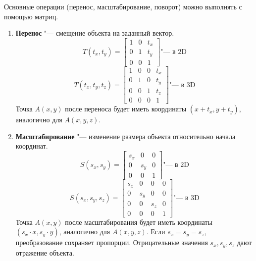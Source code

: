 Основные операции (перенос, масштабирование, поворот) можно выполнять с помощью матриц.
\begin{enumerate}
    \item \textbf{Перенос} "--- смещение объекта на заданный вектор.
    \begin{equation}
        T(t_{x}, t_{y}) = 
        \begin{bmatrix}
            1 & 0 & t_{x} \\
            0 & 1 & t_{y} \\
            0 & 0 & 1
        \end{bmatrix}
        \text{"--- в 2D}
    \end{equation}
    \begin{equation}
        T(t_{x}, t_{y}, t_{z}) = 
        \begin{bmatrix}
            1 & 0 & 0 & t_{x} \\
            0 & 1 & 0 & t_{y} \\
            0 & 0 & 1 & t_{z} \\
            0 & 0 & 0 & 1
        \end{bmatrix}
        \text{"--- в 3D}
    \end{equation}
    Точка $A(x, y)$ после переноса будет иметь координаты $(x + t_{x}, y + t_{y})$, аналогично для $A(x, y, z)$. \\
    \item \textbf{Масштабирование} "--- изменение размера объекта относительно начала координат.
    \begin{equation}
        S(s_{x}, s_{y}) = 
        \begin{bmatrix}
            s_{x} & 0 & 0 \\
            0 & s_{y} & 0 \\
            0 & 0 & 1
        \end{bmatrix}
        \text{"--- в 2D}
    \end{equation}
    \begin{equation}
        S(s_{x}, s_{y}, s_{z}) = 
        \begin{bmatrix}
            s_{x} & 0 & 0 & 0 \\
            0 & s_{y} & 0 & 0 \\
            0 & 0 & s_{z} & 0 \\
            0 & 0 & 0 & 1
        \end{bmatrix}
        \text{"--- в 3D}
    \end{equation}
    Точка $A(x, y)$ после масштабирования будет иметь координаты $(s_{x} \cdot x, s_{y} \cdot y)$, аналогично для $A(x, y, z)$. Если $s_{x} = s_{y} = s_{z}$, преобразование сохраняет пропорции. Отрицательные значения $s_{x}, s_{y}, s_{z}$ дают отражение объекта.

\end{enumerate}
